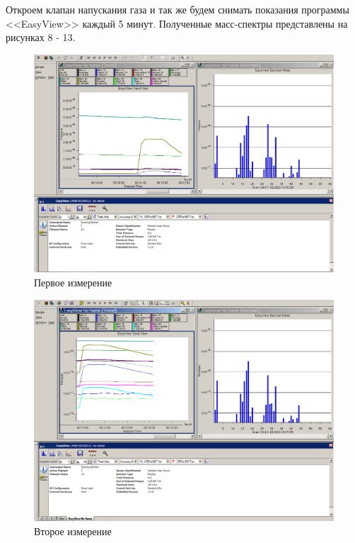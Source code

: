 \documentclass[a4paper,12pt]{article}
\begin{document}
Откроем клапан напускания газа и так же будем снимать показания программы <<EasyView>> каждый 5 минут. Полученные масс-спектры представлены на рисунках 8 - 13.

\begin{figure}[h!]
	\begin{center}
	\includegraphics[scale=0.4]{graph5}
	\caption{Первое измерение}
	\end{center}
\end{figure}

\newpage

\begin{figure}[h!]
	\begin{center}
	\includegraphics[scale=0.4]{graph6}
	\caption{Второе измерение}
	\end{center}
\end{figure}
\end{document}
